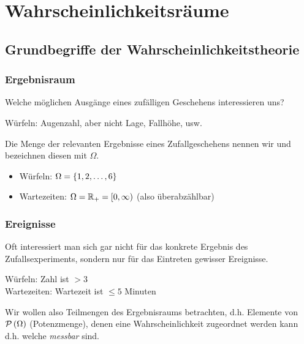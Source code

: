\chapter{Wahrscheinlichkeitsräume}
\section{Grundbegriffe der Wahrscheinlichkeitstheorie}
\subsection*{Ergebnisraum}
Welche möglichen Ausgänge eines zufälligen Geschehens interessieren uns?
\begin{*beispiel}
    Würfeln: Augenzahl, aber nicht Lage, Fallhöhe, usw.
\end{*beispiel}

\begin{definition}[Ergebnisraum]
    Die Menge der relevanten Ergebnisse eines Zufallgeschehens nennen wir  und bezeichnen diesen mit $\Omega$.
\end{definition}

\begin{*beispiel}
    \begin{itemize}
        \item Würfeln: $\Omega = \left\{ 1,2, \dots , 6 \right\}$
        \item Wartezeiten: $\Omega = \mathbb{R}_+ = [0,\infty)$ (also überabzählbar)
    \end{itemize}
\end{*beispiel}

\subsection*{Ereignisse}
Oft interessiert man sich gar nicht für das konkrete Ergebnis des Zufallsexperiments, sondern nur für das Eintreten gewisser Ereignisse.

\begin{*beispiel}
    Würfeln: Zahl ist $> 3$ \\
    Wartezeiten: Wartezeit ist $\leq 5$ Minuten
\end{*beispiel}

Wir wollen also Teilmengen des Ergebnisraums betrachten, d.h. Elemente von $\mathcal{P}\left( \Omega \right)$ (Potenzmenge), denen eine Wahrscheinlichkeit zugeordnet werden kann d.h. welche \textit{messbar} sind.

